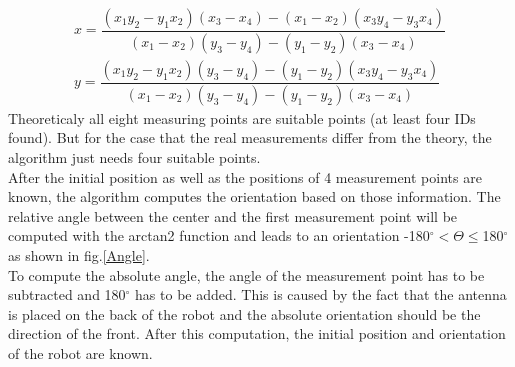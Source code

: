 \begin{align}
x = \dfrac{(x_1y_2-y_1x_2)(x_3-x_4)-(x_1-x_2)(x_3y_4-y_3x_4)}{(x_1-x_2)(y_3-y_4)-(y_1-y_2)(x_3-x_4)} \\
y = \dfrac{(x_1y_2-y_1x_2)(y_3-y_4)-(y_1-y_2)(x_3y_4-y_3x_4)}{(x_1-x_2)(y_3-y_4)-(y_1-y_2)(x_3-x_4)}
\end{align}
Theoreticaly all eight measuring points are suitable points (at least four IDs found). But for the case that the real measurements differ from the theory, the algorithm just needs four suitable points. \\
After the initial position as well as the positions of 4 measurement points are known, the algorithm computes the orientation based on those information. The relative angle between the center and the first measurement point will be computed with the arctan2 function and leads to an orientation -180$^\circ < \Theta \leq$180$^\circ$ as shown in fig.\ref{Angle}. \\
To compute the absolute angle, the angle of the measurement point has to be subtracted and 180$^\circ$ has to be added. This is caused by the fact that the antenna is placed on the back of the robot and the absolute orientation should be the direction of the front. After this computation, the initial position and orientation of the robot are known. \\

